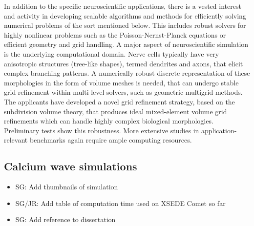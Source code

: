 \documentclass[a4paper, 11pt, notitlepage]{nsf}
\newcommand{\ug}{uG4\xspace}
\begin{document}
%
In addition to the specific neuroscientific applications, there is a vested interest and activity in developing scalable algorithms and methods for efficiently solving numerical problems of the sort mentioned below. This includes robust solvers for highly nonlinear problems such as the Poisson-Nernst-Planck equations or efficient geometry and grid handling. A major aspect of neuroscientific simulation is the underlying computational domain. Nerve cells typically have very anisotropic structures (tree-like shapes), termed dendrites and axons, that elicit complex branching patterns. A numerically robust discrete representation of these morphologies in the form of volume meshes is needed, that can undergo stable grid-refinement within multi-level solvers, such as geometric multigrid methods. The applicants have developed a novel grid refinement strategy, based on the subdivision volume theory, that produces ideal mixed-element volume grid refinements which can handle highly complex biological morphologies. Preliminary tests show this robustness. More extensive studies in application-relevant benchmarks again require ample computing resources.

\subsection*{Calcium wave simulations}

\begin{itemize}
\item SG: Add thumbnails of simulation
\item SG/JR: Add table of computation time used on XSEDE Comet so far
\item SG: Add reference to dissertation 
\end{itemize}
\end{document}
